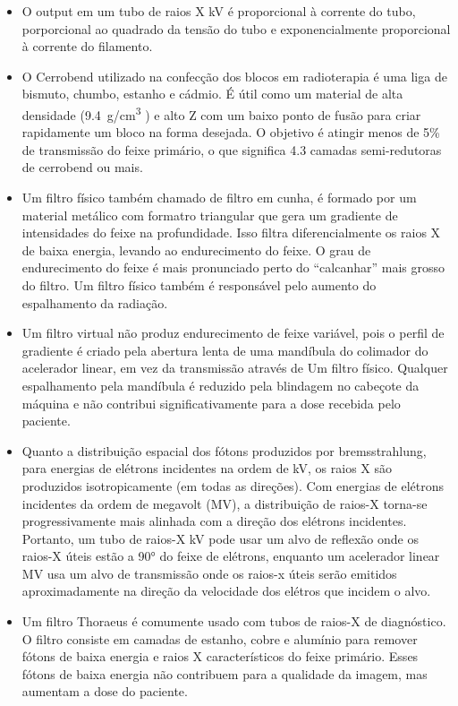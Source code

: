 \documentclass[11pt,a4paper]{article}
\newcounter{exemplo}
\begin{document}
\begin{exemplo}
\begin{itemize}
        \item O output em um tubo de raios X kV é proporcional à corrente do tubo, porporcional ao quadrado da tensão do tubo e exponencialmente proporcional à corrente do filamento.
        
        \item O Cerrobend utilizado na confecção dos blocos em radioterapia é uma liga de bismuto, chumbo, estanho e cádmio. É útil como um material de alta densidade (\qty{9.4}{g/cm^3} ) e alto Z com um baixo ponto de fusão para criar rapidamente um bloco na forma desejada. O objetivo é atingir menos de 5\% de transmissão do feixe primário, o que significa 4.3 camadas semi-redutoras de cerrobend ou mais. 
        
        \item Um filtro físico também chamado de filtro em cunha, é formado por um material metálico com formatro triangular que gera um gradiente de intensidades do feixe na profundidade. Isso filtra diferencialmente os raios X de baixa energia, levando ao endurecimento do feixe. O grau de endurecimento do feixe é mais pronunciado perto do “calcanhar” mais grosso do filtro. Um filtro físico também é responsável pelo aumento do espalhamento da radiação.
        
        \item Um filtro virtual não produz endurecimento de feixe variável, pois o perfil de gradiente é criado pela abertura lenta de uma mandíbula do colimador do acelerador linear, em vez da transmissão através de Um filtro físico. Qualquer espalhamento pela mandíbula é reduzido pela blindagem no cabeçote da máquina e não contribui significativamente para a dose recebida pelo paciente.
        
        \item Quanto a distribuição espacial dos fótons produzidos por bremsstrahlung, para energias de elétrons incidentes na ordem de kV, os raios X são produzidos isotropicamente (em todas as direções). Com energias de elétrons incidentes da ordem de megavolt (MV), a distribuição de raios-X torna-se progressivamente mais alinhada com a direção dos elétrons incidentes. Portanto, um tubo de raios-X kV pode usar um alvo de reflexão onde os raios-X úteis estão a 90° do feixe de elétrons, enquanto um acelerador linear MV usa um alvo de transmissão onde os raios-x úteis serão emitidos aproximadamente na direção da velocidade dos elétros que incidem o alvo.

        \item Um filtro Thoraeus é comumente usado com tubos de raios-X de diagnóstico. O filtro consiste em camadas de estanho, cobre e alumínio para remover fótons de baixa energia e raios X característicos do feixe primário. Esses fótons de baixa energia não contribuem para a qualidade da imagem, mas aumentam a dose do paciente.
        

\end{itemize}
\end{exemplo}
\end{document}
